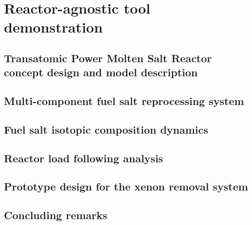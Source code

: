 \chapter[Reactor-agnostic tool demonstration]{Reactor-agnostic tool 
demonstration}

\section{Transatomic Power Molten Salt Reactor concept design and model 
description}

\section{Multi-component fuel salt reprocessing system}

\section{Fuel salt isotopic composition dynamics}

\section{Reactor load following analysis}

\section{Prototype design for the xenon removal system}

\section{Concluding remarks}